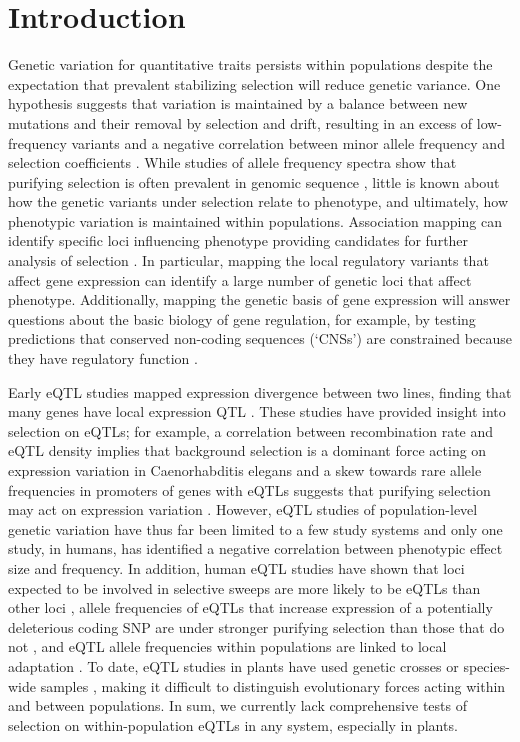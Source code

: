 \section{Introduction}
Genetic variation for quantitative traits persists within populations despite the expectation that prevalent stabilizing selection will reduce genetic variance. One hypothesis suggests that variation is maintained by a balance between new mutations and their removal by selection and drift, resulting in an excess of low-frequency variants and a negative correlation between minor allele frequency and selection coefficients \citep{Haldane1927-pj}. While studies of allele frequency spectra show that purifying selection is often prevalent in genomic sequence \citep{Kousathanas2011-bf,Zhu2011-gf,Williamson2014-tf}, little is known about how the genetic variants under selection relate to phenotype, and ultimately, how phenotypic variation is maintained within populations. Association mapping can identify specific loci influencing phenotype providing candidates for further analysis of selection \citep{Lee2014-pi}. In particular, mapping the local regulatory variants that affect gene expression can identify a large number of genetic loci that affect phenotype. Additionally, mapping the genetic basis of gene expression will answer questions about the basic biology of gene regulation, for example, by testing predictions that conserved non-coding sequences (‘CNSs’) are constrained because they have regulatory function \citep{Haudry2013-qe}.

Early eQTL studies mapped expression divergence between two lines, finding that many genes have local expression QTL \citep{Brem2005-gs,Brem2002-cc}. These studies have provided insight into selection on eQTLs; for example,  a correlation between recombination rate and eQTL density implies that background selection is a dominant force acting on expression variation in Caenorhabditis elegans \citep{Rockman2010-qm} and a skew towards rare allele frequencies in promoters of genes with eQTLs suggests that purifying selection may act on expression variation \citep{Ronald2007-hf}. However, eQTL studies of population-level genetic variation have thus far been limited to a few study systems \citep{Massouras2012-wq,Pickrell2010-ci,Lappalainen2013-jh,Battle2014-ke,Tung2015-cg} and only one study, in humans, has identified a negative correlation between phenotypic effect size and frequency\citep{Battle2014-ke}. In addition, human eQTL studies have shown that loci expected to be involved in selective sweeps are more likely to be eQTLs than other loci \citep{Kudaravalli2009-gw}, allele frequencies of eQTLs that increase expression of a potentially deleterious coding SNP are under stronger purifying selection than those that do not \citep{Lappalainen2011-tw}, and eQTL allele frequencies within populations are linked to local adaptation \citep{Fraser2013-rm,Ye2013-fx}. To date, eQTL studies in plants have used genetic crosses \citep{Potokina2008-bk,West2007-fm,Bolon2014-km} or species-wide samples \citep{Gan2011-xv, Zhang2011-ut,Fu2013-kf}, making it difficult to distinguish evolutionary forces acting within and between populations. In sum, we currently lack comprehensive tests of selection on within-population eQTLs in any system, especially in plants.

